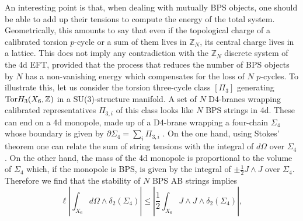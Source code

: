 \documentclass[11pt]{article}
\def\be{\begin{equation}}
\def\ee{\end{equation}}
\def\oh{\frac{1}{2}}
\def\p {{\partial}}
\newcommand{\IZ}{\mathbb{Z}}
\begin{document}
An interesting point is that, when dealing with mutually BPS objects, one should be able to add up their tensions to compute the energy of the total system. Geometrically, this amounts to say that even if the topological charge of a calibrated torsion $p$-cycle or a sum of them lives in $\IZ_N$, its central charge lives in a lattice. This does not imply any contradiction with the $\IZ_N$ discrete system of the 4d EFT, provided that the process that reduces the number of BPS objects by $N$ has a non-vanishing energy which compensates for the loss of $N$ $p$-cycles. To illustrate this, let us consider the torsion three-cycle class $[\Pi_3]$ generating ${\rm Tor} H_3(X_6, \IZ)$ in a SU(3)-structure manifold. A set of $N$ D4-branes wrapping calibrated representatives $\Pi_{3,i}$ of this class looks like $N$ BPS strings in 4d. These can end on a 4d monopole, made up of a D4-brane wrapping a four-chain $\Sigma_4$ whose boundary is given by $\p \Sigma_4= \sum_i \Pi_{3,i}$ \cite{Camara:2011jg}. On the one hand, using Stokes' theorem one can relate the sum of string tensions with the integral of $d\Omega$ over $\Sigma_4$. On the other hand, the mass of the 4d monopole is proportional to the volume of $\Sigma_4$ which, if the monopole is BPS, is given by the integral of $\pm \oh J \wedge J$ over $\Sigma_4$. Therefore we find that the stability of $N$ BPS AB strings implies
 \be
\ell \left| \int_{X_6} d\Omega \wedge \delta_2(\Sigma_4)\right| \leq \left| \oh \int_{X_6} J \wedge J  \wedge \delta_2(\Sigma_4) \right| ,
\label{BPSmono}
\ee
\end{document}
